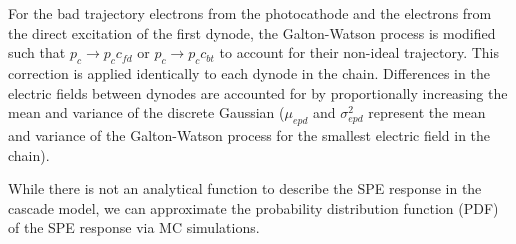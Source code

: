 \documentclass[11pt,a4paper]{article}
\begin{document}
For the bad trajectory electrons from the photocathode and the electrons from the direct excitation of the first dynode, the Galton-Watson process is modified such that $p_{c} \rightarrow p_{c} c_{fd}$ or $p_{c} \rightarrow p_{c} c_{bt}$ to account for their non-ideal trajectory.  This correction is applied identically to each dynode in the chain.  Differences in the electric fields between dynodes are accounted for by proportionally increasing the mean and variance of the discrete Gaussian ($\mu_{epd}$ and $\sigma^2_{epd}$ represent the mean and variance of the Galton-Watson process for the smallest electric field in the chain).

While there is not an analytical function to describe the SPE response in the cascade model, we can approximate the probability distribution function (PDF) of the SPE response via MC simulations.







\end{document}
